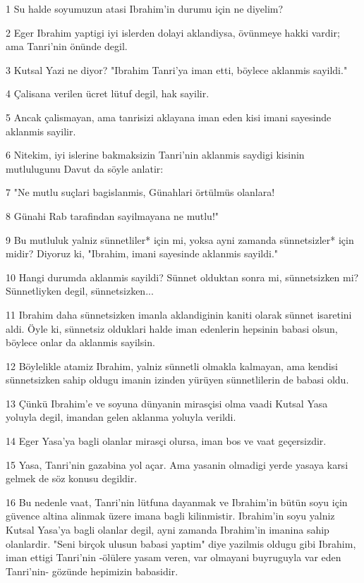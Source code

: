 \par 1 Su halde soyumuzun atasi Ibrahim'in durumu için ne diyelim?
\par 2 Eger Ibrahim yaptigi iyi islerden dolayi aklandiysa, övünmeye hakki vardir; ama Tanri'nin önünde degil.
\par 3 Kutsal Yazi ne diyor? "Ibrahim Tanri'ya iman etti, böylece aklanmis sayildi."
\par 4 Çalisana verilen ücret lütuf degil, hak sayilir.
\par 5 Ancak çalismayan, ama tanrisizi aklayana iman eden kisi imani sayesinde aklanmis sayilir.
\par 6 Nitekim, iyi islerine bakmaksizin Tanri'nin aklanmis saydigi kisinin mutlulugunu Davut da söyle anlatir:
\par 7 "Ne mutlu suçlari bagislanmis, Günahlari örtülmüs olanlara!
\par 8 Günahi Rab tarafindan sayilmayana ne mutlu!"
\par 9 Bu mutluluk yalniz sünnetliler* için mi, yoksa ayni zamanda sünnetsizler* için midir? Diyoruz ki, "Ibrahim, imani sayesinde aklanmis sayildi."
\par 10 Hangi durumda aklanmis sayildi? Sünnet olduktan sonra mi, sünnetsizken mi? Sünnetliyken degil, sünnetsizken...
\par 11 Ibrahim daha sünnetsizken imanla aklandiginin kaniti olarak sünnet isaretini aldi. Öyle ki, sünnetsiz olduklari halde iman edenlerin hepsinin babasi olsun, böylece onlar da aklanmis sayilsin.
\par 12 Böylelikle atamiz Ibrahim, yalniz sünnetli olmakla kalmayan, ama kendisi sünnetsizken sahip oldugu imanin izinden yürüyen sünnetlilerin de babasi oldu.
\par 13 Çünkü Ibrahim'e ve soyuna dünyanin mirasçisi olma vaadi Kutsal Yasa yoluyla degil, imandan gelen aklanma yoluyla verildi.
\par 14 Eger Yasa'ya bagli olanlar mirasçi olursa, iman bos ve vaat geçersizdir.
\par 15 Yasa, Tanri'nin gazabina yol açar. Ama yasanin olmadigi yerde yasaya karsi gelmek de söz konusu degildir.
\par 16 Bu nedenle vaat, Tanri'nin lütfuna dayanmak ve Ibrahim'in bütün soyu için güvence altina alinmak üzere imana bagli kilinmistir. Ibrahim'in soyu yalniz Kutsal Yasa'ya bagli olanlar degil, ayni zamanda Ibrahim'in imanina sahip olanlardir. "Seni birçok ulusun babasi yaptim" diye yazilmis oldugu gibi Ibrahim, iman ettigi Tanri'nin -ölülere yasam veren, var olmayani buyruguyla var eden Tanri'nin- gözünde hepimizin babasidir.
